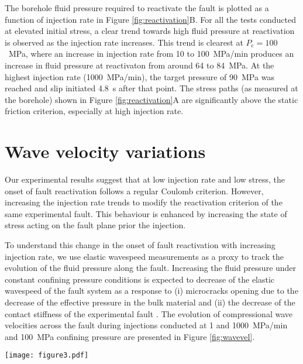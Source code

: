 \documentclass[grl]{agutex2arxiv}
\begin{document}
\begin{article}
The borehole fluid pressure required to reactivate the fault is plotted as a function of injection rate in Figure \ref{fig:reactivation}B. For all the tests conducted at elevated initial stress, a clear trend towards high fluid pressure at reactivation is observed as the injection rate increases. This trend is clearest at $P_\mathrm{c}=100$~MPa, where an increase in injection rate from 10 to 100~MPa/min produces an increase in fluid pressure at reactivaton from around 64 to 84~MPa. At the highest injection rate (1000~MPa/min), the target pressure of 90~MPa was reached and slip initiated 4.8~s after that point. The stress paths (as measured at the borehole) shown in Figure \ref{fig:reactivation}A are significantly above the static friction criterion, especially at high injection rate.

\section{Wave velocity variations}

Our experimental results suggest that at low injection rate and low stress, the onset of fault reactivation follows a regular Coulomb criterion. However, increasing the injection rate trends to modify the reactivation criterion of the same experimental fault. This behaviour is enhanced by increasing the state of stress acting on the fault plane prior the injection.

To understand this change in the onset of fault reactivation with increasing injection rate, we use elastic wavespeed measurements as a proxy to track the evolution of the fluid pressure along the fault. Increasing the fluid pressure under constant confining pressure conditions is expected to decrease of the elastic wavespeed of the fault system as a response to (i) microcracks opening due to the decrease of the effective pressure in the bulk material \citep{Walsh1965,Nasseri2009} and (ii) the decrease of the contact stiffness of the experimental fault \citep{Gueguen2011,Kelly2017}. The evolution of compressional wave velocities across the fault during injections conducted at 1 and 1000~MPa/min and 100~MPa confining pressure are presented in Figure \ref{fig:wavevel}.

\begin{figure*}
\begin{center}
\texttt{[image: figure3.pdf]}
\end{center}
\caption{Fluid pressure and wave velocities during injection. (A). Evolution of fluid pressure and slip during injection conducted at 1~MPa/min, $P_\mathrm{c}=100$~MPa. (B) Time evolution of the normalised change in compressional wave velocity during injection conducted at 1~MPa/min, $P_\mathrm{c}=100$~MPa, as a function of distance between injection point and intersection point of raypath and fault plane. The velocity along each path is normalised by the difference between its extrema. Both vertical variation and colorbar corresponds to the normalised velocity change. (C) and (D) are similar to (A) and (B) for an injection conducted at 1000~MPa/min.}
\label{fig:wavevel}
\end{figure*}



\end{article}
\end{document}
